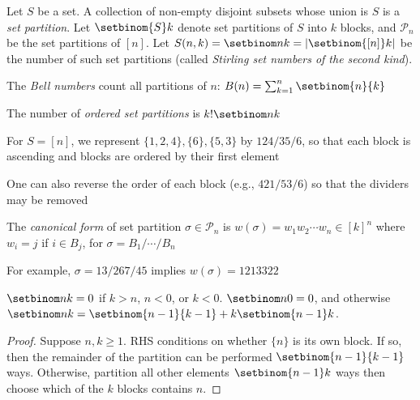 \documentclass[a4paper]{article}
\begin{document}
\begin{definition}
Let $S$ be a set. A collection of non-empty disjoint subsets whose union is $S$ is a \emph{set partition}. Let $\setbinom{S}k$ denote set partitions of $S$ into $k$ blocks, and $\mathcal P_n$ be the set partitions of $[n]$. Let $S(n,k)=\setbinom nk=\left|\setbinom{[n]}k\right|$ be the number of such set partitions (called \emph{Stirling set numbers of the second kind}).
\begin{arrows}
\item The \emph{Bell numbers} count all partitions of $n$: $B(n)=\sum_{k=1}^n\setbinom{n}{k}$
\item The number of \emph{ordered set partitions} is $k!\setbinom nk$
\item For $S=[n]$, we represent $\{1,2,4\},\{6\},\{5,3\}$ by $124/35/6$, so that each block is ascending and blocks are ordered by their first element
\item One can also reverse the order of each block (e.g., $421/53/6$) so that the dividers may be removed
\item The \emph{canonical form} of set partition $\sigma\in\mathcal P_n$ is $w(\sigma)=w_1w_2\cdots w_n\in[k]^n$ where $w_i=j$ if $i\in B_j$, for $\sigma=B_1/\cdots/B_n$
\item For example, $\sigma=13/267/45$ implies $w(\sigma)=1213322$
\end{arrows}
\end{definition}

\begin{theorem}\label{setbinom_recurse}
$\setbinom nk=0$ if $k>n$, $n<0$, or $k<0$. $\setbinom n0=0$, and otherwise $\setbinom nk=\setbinom{n-1}{k-1}+k\setbinom{n-1}k$.

\begin{hl}
\begin{proof}
Suppose $n,k\geq1$. RHS conditions on whether $\{n\}$ is its own block. If so, then the remainder of the partition can be performed $\setbinom{n-1}{k-1}$ ways. Otherwise, partition all other elements $\setbinom{n-1}k$ ways then choose which of the $k$ blocks contains $n$.
\end{proof}
\end{hl}
\end{theorem}
\end{document}
